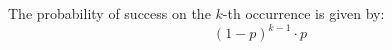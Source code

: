 \documentclass{article}
\begin{document}
The probability of success on the \(k\)-th occurrence is given by:
\[
(1 - p)^{k-1} \cdot p
\]
\end{document}

